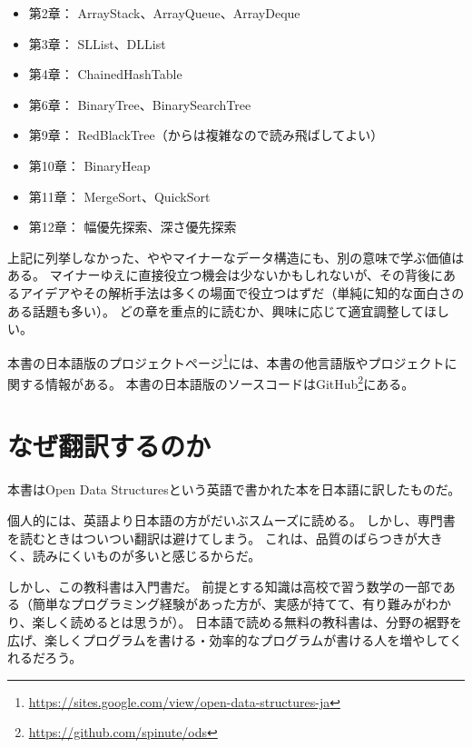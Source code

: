 \begin{itemize}
  \item 第2章： ArrayStack、ArrayQueue、ArrayDeque
  \item 第3章： SLList、DLList
  \item 第4章： ChainedHashTable
  \item 第6章： BinaryTree、BinarySearchTree
  \item 第9章： RedBlackTree（からは複雑なので読み飛ばしてよい）
  \item 第10章： BinaryHeap
  \item 第11章： MergeSort、QuickSort
  \item 第12章： 幅優先探索、深さ優先探索
\end{itemize}

上記に列挙しなかった、ややマイナーなデータ構造にも、別の意味で学ぶ価値はある。
マイナーゆえに直接役立つ機会は少ないかもしれないが、その背後にあるアイデアやその解析手法は多くの場面で役立つはずだ（単純に知的な面白さのある話題も多い）。
どの章を重点的に読むか、興味に応じて適宜調整してほしい。

本書の日本語版のプロジェクトページ\footnote {\url{https://sites.google.com/view/open-data-structures-ja}}には、本書の他言語版やプロジェクトに関する情報がある。
本書の日本語版のソースコードはGitHub\footnote {\url{https://github.com/spinute/ods}}にある。

\chapter*{なぜ翻訳するのか}
本書はOpen Data Structuresという英語で書かれた本を日本語に訳したものだ。

個人的には、英語より日本語の方がだいぶスムーズに読める。
しかし、専門書を読むときはついつい翻訳は避けてしまう。
これは、品質のばらつきが大きく、読みにくいものが多いと感じるからだ。

しかし、この教科書は入門書だ。
前提とする知識は高校で習う数学の一部である（簡単なプログラミング経験があった方が、実感が持てて、有り難みがわかり、楽しく読めるとは思うが）。
日本語で読める無料の教科書は、分野の裾野を広げ、楽しくプログラムを書ける・効率的なプログラムが書ける人を増やしてくれるだろう。

